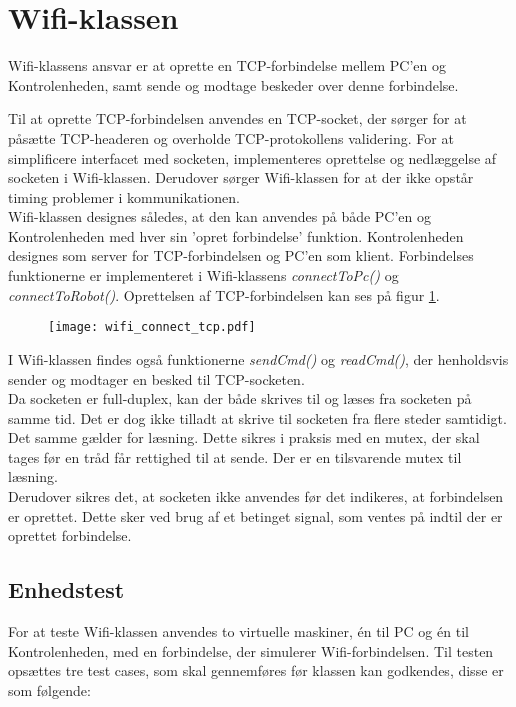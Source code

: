 %

%

\section{Wifi-klassen}
Wifi-klassens ansvar er at oprette en TCP-forbindelse mellem PC'en og Kontrolenheden, samt sende og modtage beskeder over denne forbindelse.

Til at oprette TCP-forbindelsen anvendes en TCP-socket, der sørger for at påsætte TCP-headeren og overholde TCP-protokollens validering. 
For at simplificere interfacet med socketen, implementeres oprettelse og nedlæggelse af socketen i Wifi-klassen. 
Derudover sørger Wifi-klassen for at der ikke opstår timing problemer i kommunikationen.  \\
Wifi-klassen designes således, at den kan anvendes på både PC’en og Kontrolenheden med hver sin 'opret forbindelse' funktion. 
Kontrolenheden designes som server for TCP-forbindelsen og PC’en som klient.
Forbindelses funktionerne er implementeret i Wifi-klassens \textit{connectToPc()} og \textit{connectToRobot()}.
Oprettelsen af TCP-forbindelsen kan ses på figur \ref{fig:wifi_connect_tcp}.

\begin{figure} [H]
\centering
	\texttt{[image: wifi\_connect\_tcp.pdf]}
	\label{fig:wifi_connect_tcp}
\end{figure}

I Wifi-klassen findes også funktionerne \textit{sendCmd()} og \textit{readCmd()}, der henholdsvis sender og modtager en besked til TCP-socketen. \\
Da socketen er full-duplex, kan der både skrives til og læses fra socketen på samme tid. 
Det er dog ikke tilladt at skrive til socketen fra flere steder samtidigt.
Det samme gælder for læsning.
Dette sikres i praksis med en mutex, der skal tages før en tråd får rettighed til at sende. Der er en tilsvarende mutex til læsning. \\
Derudover sikres det, at socketen ikke anvendes før det indikeres, at forbindelsen er oprettet.
Dette sker ved brug af et betinget signal, som ventes på indtil der er oprettet forbindelse.


\subsection{Enhedstest}
For at teste Wifi-klassen anvendes to virtuelle maskiner, én til PC og én til Kontrolenheden, med en forbindelse, der simulerer Wifi-forbindelsen. 
Til testen opsættes tre test cases, som skal gennemføres før klassen kan godkendes, disse er som følgende:
	
